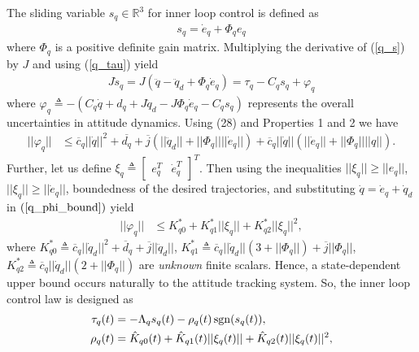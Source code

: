 The sliding variable $s_q \in{\mathbb{R}^3}$ for inner loop control is defined as
\begin{align}
     s_q = \dot{e}_q + \Phi_q e_q \label{q_s}
\end{align}
where $\Phi_{q}$ is a positive definite gain matrix. Multiplying the derivative of (\ref{q_s}) by $J$ and using (\ref{q_tau}) yield
\begin{align}
     J\dot{s}_q = J(\ddot{q}-\ddot{q}_d + \Phi_q{\dot{e}_q}) = \tau_q - C_q s_q + \varphi_q \label{dot_s_q}
 \end{align}
 where $\varphi_q 
 \triangleq -(C_q \dot{q} + d_q + J\ddot{q}_d - J\Phi_q\dot{e}_q - C_q s_q)$ represents the overall uncertainties in attitude dynamics. Using (28) and Properties 1 and 2 we have
 \begin{align}
     ||\varphi_{q}|| &\leq \overline{c}_q||\dot{q}||^2 + \overline{d_{q}} + \overline{j}(||\ddot{q}_d|| + ||\Phi_{q}|| ||\dot{e}_{q}||)  + \overline{c}_q||\dot{q}||(||\dot{e}_{q}|| + ||\Phi_{q}||||q||). \label{q_phi_bound}
 \end{align}
 Further, let us define $\xi_q \triangleq
	\begin{bmatrix}
	e_q^T & \dot{e}_q^T
	\end{bmatrix}^T$. Then using the inequalities $||\xi_q|| \geq ||e_q||$, $||\xi_q|| \geq ||\dot{e}_q||$, boundedness of the desired trajectories, and substituting $\dot{q} = \dot{e}_q + \dot{q}_d$ in $(\ref{q_phi_bound})$ yield
\begin{align}
    ||\varphi_{q}|| &\leq K_{q0}^* + K_{q1}^*||\xi_{q}|| + K_{q2}^*||\xi_{q}||^2, \label{q_up_bound_K}
\end{align}
where $K_{q0}^* \triangleq \overline{c}_q||\dot{q}_d||^2 + \overline{d}_q + \overline{j}||\ddot{q}_d||$, $K_{q1}^* \triangleq \overline{c}_q||\dot{q}_d||(3 + ||\Phi_q||) + \overline{j}||\Phi_q||$, $K_{q2}^* \triangleq {\overline{c}_q||\dot{q}_d||(2 + ||\Phi_q||)}$ are \textit{unknown} finite scalars. Hence, a state-dependent upper bound occurs naturally to the attitude tracking system. So, the inner loop control law is designed as
\begin{subequations}\label{ip_inn}
\begin{align}
	    \tau_q (t) &= -\Lambda_q s_q (t) - \rho_q (t) \operatorname{sgn}(s_q(t)), \label{q_con_tau} \\
	    \rho_{q}(t) &= \hat{K}_{q0}(t) + \hat{K}_{q1}(t)||\xi_q (t)|| + \hat{K}_{q2}(t)||\xi_q(t)||^2, \label{q_con_rho}
\end{align}
\end{subequations}
